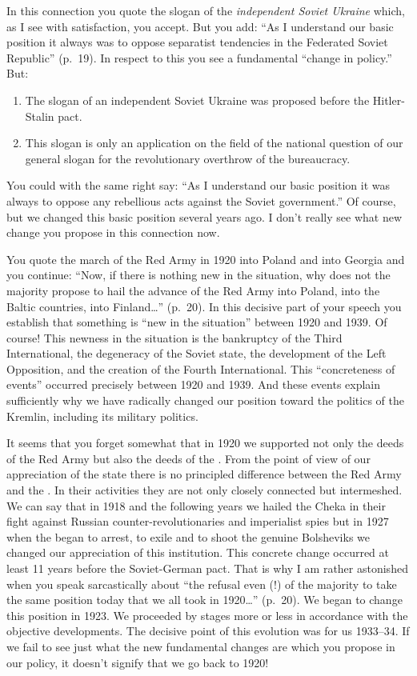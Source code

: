 In this connection you quote the slogan of the \emph{independent Soviet Ukraine} which, as I see with satisfaction, you accept. But you add: “As I understand our basic position it always was to oppose separatist tendencies in the Federated Soviet Republic” (p.~19). In respect to this you see a fundamental “change in policy.” But:
\begin{enumerate}
  \item The slogan of an independent Soviet Ukraine was proposed before the Hitler-Stalin pact.
  \item This slogan is only an application on the field of the national question of our general slogan for the revolutionary overthrow of the bureaucracy.
\end{enumerate}

You could with the same right say: “As I understand our basic position it was always to oppose any rebellious acts against the Soviet government.” Of course, but we changed this basic position several years ago. I don’t really see what new change you propose in this connection now.

You quote the march of the Red Army in 1920 into Poland and into Georgia and you continue: “Now, if there is nothing new in the situation, why does not the majority propose to hail the advance of the Red Army into Poland, into the Baltic countries, into Finland\dots'' (p.~20). In this decisive part of your speech you establish that something is “new in the situation” between 1920 and 1939. Of course! This newness in the situation is the bankruptcy of the Third International, the degeneracy of the Soviet state, the development of the Left Opposition, and the creation of the Fourth International. This “concreteness of events” occurred precisely between 1920 and 1939. And these events explain sufficiently why we have radically changed our position toward the politics of the Kremlin, including its military politics.

It seems that you forget somewhat that in 1920 we supported not only the deeds of the Red Army but also the deeds of the \GPU. From the point of view of our appreciation of the state there is no principled difference between the Red Army and the \GPU. In their activities they are not only closely connected but intermeshed. We can say that in 1918 and the following years we hailed the Cheka in their fight against Russian counter-revolutionaries and imperialist spies but in 1927 when the \GPU began to arrest, to exile and to shoot the genuine Bolsheviks we changed our appreciation of this institution. This concrete change occurred at least 11 years before the Soviet-German pact. That is why I am rather astonished when you speak sarcastically about “the refusal even (!) of the majority to take the same position today that we all took in 1920\dots” (p.~20). We began to change this position in 1923. We proceeded by stages more or less in accordance with the objective developments. The decisive point of this evolution was for us 1933--34. If we fail to see just what the new fundamental changes are which you propose in our policy, it doesn’t signify that we go back to 1920!

